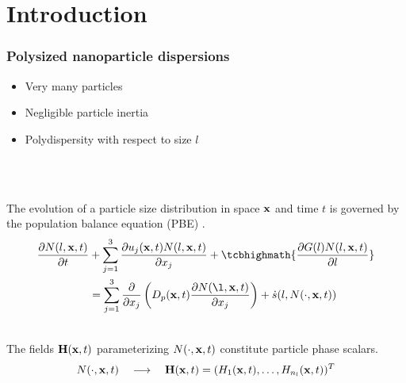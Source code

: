 \documentclass[10pt,xcolor=dvipsnames]{beamer}
\newcommand*{\itemskip}{0.25\baselineskip}
\renewcommand{\cite}{\parencite}
\begin{document}
\begin{frame}

  \resizebox{0.4\columnwidth}{!}{}

\end{frame}



\section{Introduction}
\begin{frame}[t]
  
  \frametitle{Polysized nanoparticle dispersions}
  
  \vspace{-0.5\baselineskip}
  \begin{minipage}[t]{0.6\columnwidth}\vskip0pt
  \justifying{}
  \begin{itemize}
  \item Very many particles
  \vspace{\itemskip}
  \item Negligible particle inertia
  \vspace{\itemskip}
  \item Polydispersity with respect to size $l$
  \end{itemize}
  \end{minipage}\hfill
  \begin{minipage}[t]{0.38\columnwidth}\vskip0pt
  \resizebox{\columnwidth}{!}{}
  \end{minipage}\\
  \vspace{0.5\baselineskip}
  
  \\
  \justifying The evolution of a particle size distribution in space ${\mathbf x}$ and time $t$ is governed by the population balance equation (PBE) \cite{Hulburt1964}.
  \begin{equation*}
  \begin{split}
    \frac{\partial N(l, \xbf, t)}{\partial t} &+ \sum_{j = 1}^{3} \frac{\partial u_j(\xbf, t) N(l, \xbf, t)}{\partial x_j} 
    + \tcbhighmath{\frac{\partial G(l) N(l, \xbf, t)}{\partial l}} \\
    &= \sum_{j = 1}^{3} \frac{\partial}{\partial x_j}\left(D_p(\xbf, t) \frac{\partial N(\l, \xbf, t)}{\partial x_j}\right) + \dot{s}(l, N(\cdot, \xbf, t))
  \label{eq:pbe}
  \end{split}
  \end{equation*}
  
  \\
  \justifying The fields ${\mathbf H}({\mathbf x}, t)$ parameterizing $N(\cdot, {\mathbf x}, t)$ constitute particle phase scalars.
  \begin{equation*}
    N(\cdot, {\mathbf x}, t) \quad\longrightarrow\quad {\mathbf H}({\mathbf x}, t) = (H_1({\mathbf x}, t), \ldots, H_{n_l}({\mathbf x}, t))^T
  \end{equation*}

\end{frame}
\end{document}

